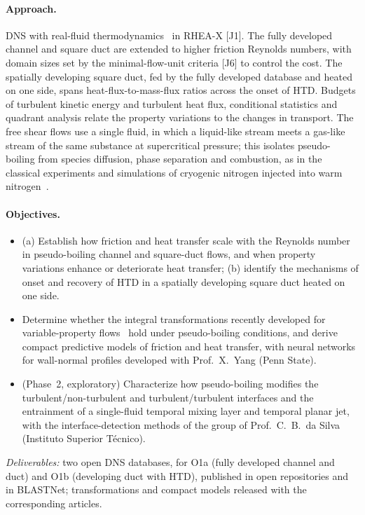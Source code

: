 \documentclass[11pt]{article}
\begin{document}
\paragraph{Approach.} DNS with real-fluid thermodynamics~\cite{PengRobinson1976,Chung1988} in
RHEA-X [J1]. The fully developed channel and square duct are extended to higher friction Reynolds
numbers, with domain sizes set by the minimal-flow-unit criteria [J6] to control the cost. The
spatially developing square duct, fed by the fully developed database and heated on one side,
spans heat-flux-to-mass-flux ratios across the onset of HTD. Budgets of turbulent kinetic energy
and turbulent heat flux, conditional statistics and quadrant analysis relate the property
variations to the changes in transport. The free shear flows use a single fluid, in which a
liquid-like stream meets a gas-like stream of the same substance at supercritical pressure; this
isolates pseudo-boiling from species diffusion, phase separation and combustion, as in the
classical experiments and simulations of cryogenic nitrogen injected into warm
nitrogen~\cite{Mayer2003,Muller2016,Lapenna2019}.
\paragraph{Objectives.}
\begin{itemize}
  \item[\textbf{O1.}] (a) Establish how friction and heat transfer scale with the Reynolds
  number in pseudo-boiling channel and square-duct flows, and when property variations enhance
  or deteriorate heat transfer; (b) identify the mechanisms of onset and recovery of HTD in a
  spatially developing square duct heated on one side.
  \item[\textbf{O2.}] Determine whether the integral transformations recently developed for
  variable-property flows~\cite{Modesti2026} hold under pseudo-boiling conditions, and derive
  compact predictive models of friction and heat transfer, with neural networks for wall-normal
  profiles developed with Prof.\ X.\ Yang (Penn State).
  \item[\textbf{O3.}] (Phase~2, exploratory) Characterize how pseudo-boiling modifies the
  turbulent/non-turbulent and turbulent/turbulent interfaces and the entrainment of a
  single-fluid temporal mixing layer and temporal planar jet, with the interface-detection
  methods of the group of Prof.\ C.\ B.\ da Silva (Instituto Superior T\'ecnico).
\end{itemize}
\emph{Deliverables:} two open DNS databases, for O1a (fully developed channel and duct) and O1b
(developing duct with HTD), published in open repositories and in BLASTNet; transformations and
compact models released with the corresponding articles.
\end{document}

